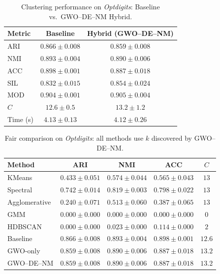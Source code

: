 \begin{table}[htbp]
\centering
\caption{Clustering performance on \textit{Optdigits}: Baseline vs.\ GWO--DE--NM Hybrid.}
\label{tab:optdigits}
\begin{tabular}{lcc}
\toprule
Metric & Baseline & Hybrid (GWO--DE--NM) \\
\midrule
ARI & $\mathbf{0.866 \pm 0.008}$ & $0.859 \pm 0.008$ \\
NMI & $\mathbf{0.893 \pm 0.004}$ & $0.890 \pm 0.006$ \\
ACC & $\mathbf{0.898 \pm 0.001}$ & $0.887 \pm 0.018$ \\
SIL & $0.832 \pm 0.015$ & $\mathbf{0.854 \pm 0.024}$ \\
MOD & $0.904 \pm 0.001$ & $\mathbf{0.905 \pm 0.004}$ \\
\midrule
$C$ & $12.6 \pm 0.5$ & $13.2 \pm 1.2$ \\
Time (s) & $4.13 \pm 0.13$ & $4.12 \pm 0.26$ \\
\bottomrule
\end{tabular}
\end{table}

\begin{table}[htbp]
\centering\small
\caption{Fair comparison on \textit{Optdigits}: all methods use $k$ discovered by GWO--DE--NM.}
\label{tab:fair_optdigits}
\begin{tabular}{lcccc}
\toprule
Method & ARI & NMI & ACC & $C$ \\
\midrule
KMeans & $0.433 \pm 0.051$ & $0.574 \pm 0.044$ & $0.565 \pm 0.043$ & $13$ \\
Spectral & $0.742 \pm 0.014$ & $0.819 \pm 0.003$ & $0.798 \pm 0.022$ & $13$ \\
Agglomerative & $0.240 \pm 0.071$ & $0.513 \pm 0.060$ & $0.387 \pm 0.065$ & $13$ \\
GMM & $0.000 \pm 0.000$ & $0.000 \pm 0.000$ & $0.000 \pm 0.000$ & $0$ \\
HDBSCAN & $0.000 \pm 0.000$ & $0.023 \pm 0.000$ & $0.114 \pm 0.000$ & $2$ \\
\midrule
Baseline & $\mathbf{0.866 \pm 0.008}$ & $0.893 \pm 0.004$ & $0.898 \pm 0.001$ & $12.6$ \\
GWO-only & $0.859 \pm 0.008$ & $0.890 \pm 0.006$ & $0.887 \pm 0.018$ & $13.2$ \\
GWO--DE--NM & $0.859 \pm 0.008$ & $0.890 \pm 0.006$ & $0.887 \pm 0.018$ & $13.2$ \\
\bottomrule
\end{tabular}
\end{table}

